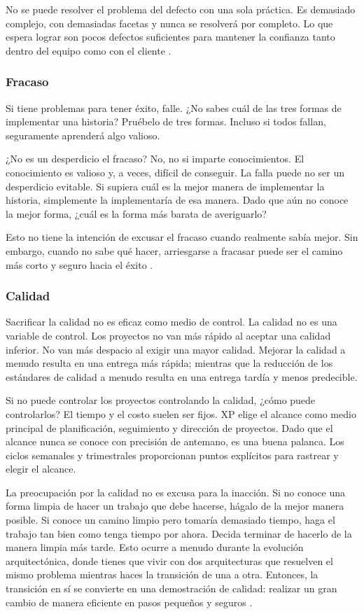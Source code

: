 \begin{spacing}{1.5}
			No se puede resolver el problema del defecto con una sola práctica. Es demasiado complejo, con demasiadas facetas y nunca se resolverá por completo. Lo que espera lograr son pocos defectos suficientes para mantener la confianza tanto dentro del equipo como con el cliente \cite{chap2_extreme_programming}.
		\subsubsection{Fracaso}
			Si tiene problemas para tener éxito, falle. ¿No sabes cuál de las tres formas de implementar una historia? Pruébelo de tres formas. Incluso si todos fallan, seguramente aprenderá algo valioso.
			
			¿No es un desperdicio el fracaso? No, no si imparte conocimientos. El conocimiento es valioso y, a veces, difícil de conseguir. La falla puede no ser un desperdicio evitable. Si supiera cuál es la mejor manera de implementar la historia, simplemente la implementaría de esa manera. Dado que aún no conoce la mejor forma, ¿cuál es la forma más barata de averiguarlo?
			
			Esto no tiene la intención de excusar el fracaso cuando realmente sabía mejor. Sin embargo, cuando no sabe qué hacer, arriesgarse a fracasar puede ser el camino más corto y seguro hacia el éxito \cite{chap2_extreme_programming}.
		\subsubsection{Calidad}
			Sacrificar la calidad no es eficaz como medio de control. La calidad no es una variable de control. Los proyectos no van más rápido al aceptar una calidad inferior. No van más despacio al exigir una mayor calidad. Mejorar la calidad a menudo resulta en una entrega más rápida; mientras que la reducción de los estándares de calidad a menudo resulta en una entrega tardía y menos predecible.
			
			Si no puede controlar los proyectos controlando la calidad, ¿cómo puede controlarlos? El tiempo y el costo suelen ser fijos. XP elige el alcance como medio principal de planificación, seguimiento y dirección de proyectos. Dado que el alcance nunca se conoce con precisión de antemano, es una buena palanca. Los ciclos semanales y trimestrales proporcionan puntos explícitos para rastrear y elegir el alcance.
			
			La preocupación por la calidad no es excusa para la inacción. Si no conoce una forma limpia de hacer un trabajo que debe hacerse, hágalo de la mejor manera posible. Si conoce un camino limpio pero tomaría demasiado tiempo, haga el trabajo tan bien como tenga tiempo por ahora. Decida terminar de hacerlo de la manera limpia más tarde. Esto ocurre a menudo durante la evolución arquitectónica, donde tienes que vivir con dos arquitecturas que resuelven el mismo problema mientras haces la transición de una a otra. Entonces, la transición en sí se convierte en una demostración de calidad: realizar un gran cambio de manera eficiente en pasos pequeños y seguros \cite{chap2_extreme_programming}.

\end{spacing}
